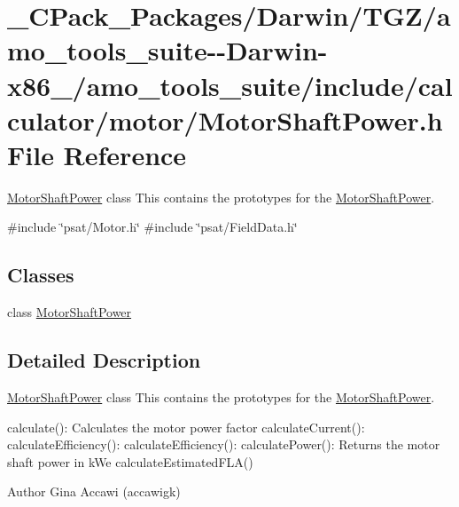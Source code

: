 \hypertarget{___c_pack___packages_2_darwin_2_t_g_z_2amo__tools__suite--_darwin-x86__64_2amo__tools__suite_2in5489e32c1364012a6c5dc7e4f7a3321f}{}\section{\+\_\+\+C\+Pack\+\_\+\+Packages/\+Darwin/\+T\+G\+Z/amo\+\_\+tools\+\_\+suite-\/-\/\+Darwin-\/x86\+\_/amo\+\_\+tools\+\_\+suite/include/calculator/motor/\+Motor\+Shaft\+Power.h File Reference}
\label{___c_pack___packages_2_darwin_2_t_g_z_2amo__tools__suite--_darwin-x86__64_2amo__tools__suite_2in5489e32c1364012a6c5dc7e4f7a3321f}


\hyperlink{class_motor_shaft_power}{Motor\+Shaft\+Power} class This contains the prototypes for the \hyperlink{class_motor_shaft_power}{Motor\+Shaft\+Power}.  


{\ttfamily \#include \char`\"{}psat/\+Motor.\+h\char`\"{}}\newline
{\ttfamily \#include \char`\"{}psat/\+Field\+Data.\+h\char`\"{}}\newline
\subsection*{Classes}
\begin{DoxyCompactItemize}
\item 
class \hyperlink{class_motor_shaft_power}{Motor\+Shaft\+Power}
\end{DoxyCompactItemize}


\subsection{Detailed Description}
\hyperlink{class_motor_shaft_power}{Motor\+Shaft\+Power} class This contains the prototypes for the \hyperlink{class_motor_shaft_power}{Motor\+Shaft\+Power}. 

calculate()\+: Calculates the motor power factor calculate\+Current()\+: calculate\+Efficiency()\+: calculate\+Efficiency()\+: calculate\+Power()\+: Returns the motor shaft power in k\+We calculate\+Estimated\+F\+L\+A()

\begin{DoxyAuthor}{Author}
Gina Accawi (accawigk) 
\end{DoxyAuthor}
